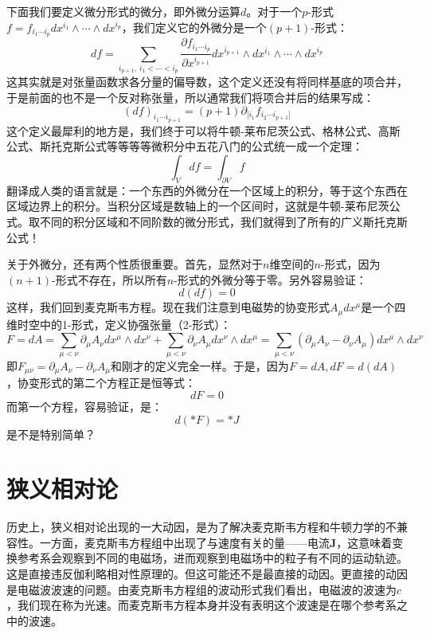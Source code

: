 \documentclass{ctexart}
\begin{document}
下面我们要定义微分形式的微分，即外微分运算$d$。对于一个$p$-形式$f=f_{i_1\cdots i_p}dx^{i_1}\wedge\cdots\wedge dx^{i_p}$，我们定义它的外微分是一个$(p+1)$-形式：
\begin{equation}
df=\sum_{\scriptstyle{i_{p+1}},\ \scriptstyle{i_1<\cdots<i_p}}\frac{\partial f_{i_1\cdots i_p}}{\partial x^{i_{p+1}}}dx^{i_{p+1}}\wedge dx^{i_1}\wedge\cdots\wedge dx^{i_p}
\end{equation}
这其实就是对张量函数求各分量的偏导数，这个定义还没有将同样基底的项合并，于是前面的也不是一个反对称张量，所以通常我们将项合并后的结果写成：
\begin{equation}
(df)_{i_1\cdots i_{p+1}}=(p+1)\partial_{[i_1}f_{i_2\cdots i_{p+1}]}
\end{equation}
这个定义最犀利的地方是，我们终于可以将牛顿-莱布尼茨公式、格林公式、高斯公式、斯托克斯公式等等等等微积分中五花八门的公式统一成一个定理：
\begin{equation}
\int_V df=\int_{\partial V}f
\end{equation}
翻译成人类的语言就是：一个东西的外微分在一个区域上的积分，等于这个东西在区域边界上的积分。当积分区域是数轴上的一个区间时，这就是牛顿-莱布尼茨公式。取不同的积分区域和不同阶数的微分形式，我们就得到了所有的广义斯托克斯公式！

关于外微分，还有两个性质很重要。首先，显然对于$n$维空间的$n$-形式，因为$(n+1)$-形式不存在，所以所有$n$-形式的外微分等于零。另外容易验证：
\begin{equation}
d(df)=0
\end{equation}
这样，我们回到麦克斯韦方程。现在我们注意到电磁势的协变形式$A_\mu dx^\mu$是一个四维时空中的1-形式，定义协强张量（2-形式）：
\begin{equation}
F=dA=\sum_{\mu<\nu}\partial_\mu A_\nu dx^\mu\wedge dx^\nu+\sum_{\mu<\nu}\partial_\nu A_\mu dx^\nu\wedge dx^\mu=\sum_{\mu<\nu}(\partial_\mu A_\nu-\partial_\nu A_\mu)dx^\mu\wedge dx^\nu
\end{equation}
即$F_{\mu\nu}=\partial_\mu A_\nu-\partial_\nu A_\mu$和刚才的定义完全一样。于是，因为$F=dA,dF=d(dA)$，协变形式的第二个方程正是恒等式：
\begin{equation}
dF=0
\end{equation}
而第一个方程，容易验证，是：
\begin{equation}
d(*F)=*J
\end{equation}
是不是特别简单？

\section{狭义相对论}
历史上，狭义相对论出现的一大动因，是为了解决麦克斯韦方程和牛顿力学的不兼容性。一方面，麦克斯韦方程组中出现了与速度有关的量——电流$\bm{J}$，这意味着变换参考系会观察到不同的电磁场，进而观察到电磁场中的粒子有不同的运动轨迹。这是直接违反伽利略相对性原理的。但这可能还不是最直接的动因。更直接的动因是电磁波波速的问题。由麦克斯韦方程组的波动形式我们看出，电磁波的波速为$c$，我们现在称为光速。而麦克斯韦方程本身并没有表明这个波速是在哪个参考系之中的波速。
\end{document}

